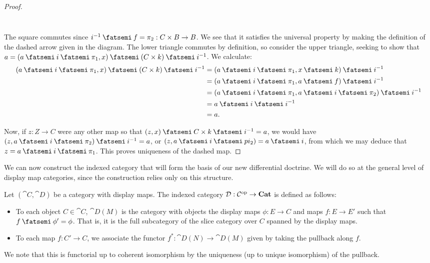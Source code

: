 \documentclass[DynamicalBook]{subfiles}
\begin{document}
\begin{proof}
\begin{itemize}
\[\begin{tikzcd}
\end{tikzcd}
\]
The square commutes since $i\inv \then f = \pi_2 : C \times B \to B$. We see that it satisfies the universal property by making the definition of the
dashed arrow given in the diagram. The lower triangle commutes by definition, so
consider the upper triangle, seeking to show that 
$a = (a\then i \then \pi_1, x) \then (C \times k) \then i\inv$. We calculate:
\begin{align*}
(a\then i \then \pi_1, x) \then (C \times k) \then i\inv &= (a\then i \then \pi_1, x \then k) \then i\inv \\
 &= (a\then i \then \pi_1, a \then f) \then i\inv \\
 &= (a\then i \then \pi_1, a \then i \then \pi_2) \then i\inv \\
 &= a \then i \then i \inv \\
&= a.
\end{align*}
\end{itemize}
Now, if $z : Z \to C$ were any other map so that $(z, x) \then C \times k \then
i\inv = a$, we would have $(z, a \then i \then \pi_2) \then i\inv = a$, or $(z,
a \then i \then pi_2) = a \then i$, from which we may deduce that $z = a \then i
\then \pi_1$. This proves uniqueness of the dashed map.
\end{proof}


We can now construct the indexed category that will form the basis of our new
differential doctrine. We will do so at the general level of display map
categories, since the construction relies only on this structure.
\begin{definition}
Let $(\cat{C}, \cat{D})$ be a category with display maps. The indexed category $\mathcal{D} : \mathcal{C}^{\textnormal{op}} \to \textbf{Cat}$ is defined as
follows:
\begin{itemize}
  \item To each object $C \in \cat{C}$, $\cat{D}(M)$ is the category with
    objects the display maps
    $\phi : E \to C$ and maps $f : E \to E'$ such that $f \then \phi' = \phi$.
    That is, it is the full subcategory of the slice category over $C$ spanned
    by the display maps.
  \item To each map $f : C' \to C$, we associate the functor $f^{\ast} :
    \cat{D}(N) \to \cat{D}(M)$ given by taking the pullback along $f$.
\end{itemize}
We note that this is functorial up to coherent isomorphism by the uniqueness (up
to unique isomorphism) of the pullback.
\end{definition}
 
\end{document}
